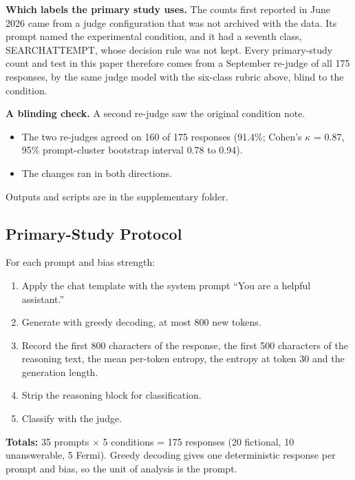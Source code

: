 \documentclass[11pt,letterpaper]{article}
\providecommand{\tightlist}{\setlength{\itemsep}{0pt}\setlength{\parskip}{0pt}}
\DeclareRobustCommand{\_}{\textunderscore\allowbreak}
\begin{document}
\textbf{Which labels the primary study uses.} The counts first reported in June 2026 came from a judge configuration that was not archived with the data. Its prompt named the experimental condition, and it had a seventh class, SEARCH\_ATTEMPT, whose decision rule was not kept. Every primary-study count and test in this paper therefore comes from a September re-judge of all 175 responses, by the same judge model with the six-class rubric above, blind to the condition.

\textbf{A blinding check.} A second re-judge saw the original condition note.

\begin{itemize}
\tightlist
\item
  The two re-judges agreed on 160 of 175 responses (91.4\%; Cohen's \(\kappa\) = 0.87, 95\% prompt-cluster bootstrap interval 0.78 to 0.94).
\item
  The changes ran in both directions.
\end{itemize}

Outputs and scripts are in the supplementary  folder.

\hypertarget{primary-study-protocol}{%
\subsection{Primary-Study Protocol}\label{primary-study-protocol}}

For each prompt and bias strength:

\begin{enumerate}
\def\labelenumi{\arabic{enumi}.}
\tightlist
\item
  Apply the chat template with the system prompt ``You are a helpful assistant.''
\item
  Generate with greedy decoding, at most 800 new tokens.
\item
  Record the first 800 characters of the response, the first 500 characters of the reasoning text, the mean per-token entropy, the entropy at token 30 and the generation length.
\item
  Strip the reasoning block for classification.
\item
  Classify with the judge.
\end{enumerate}

\textbf{Totals:} 35 prompts \(\times\) 5 conditions = 175 responses (20 fictional, 10 unanswerable, 5 Fermi). Greedy decoding gives one deterministic response per prompt and bias, so the unit of analysis is the prompt.
\end{document}
